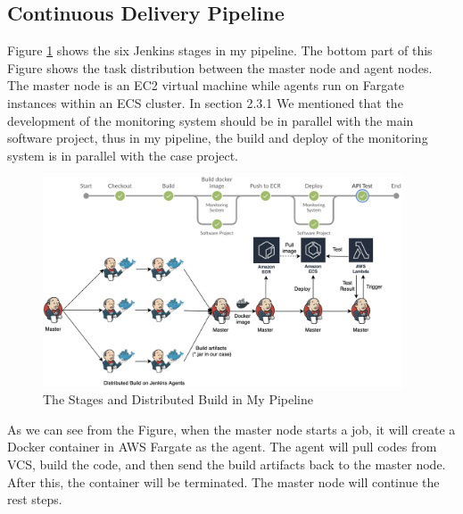 \subsection{Continuous Delivery Pipeline}
\label{my-ci}
Figure \ref{fig:overview} shows the six Jenkins stages in my pipeline. The bottom part of this Figure shows the task distribution between the master node and agent nodes. The master node is an EC2 virtual machine while agents run on Fargate instances within an ECS cluster. In section 2.3.1 We mentioned that the development of the monitoring system should be in parallel with the main software project, thus in my pipeline, the build and deploy of the monitoring system is in parallel with the case project.
\begin{figure}[!h]
     \centering
     \includegraphics[width=0.95\textwidth]{pics/overview.png}
     \caption{The Stages and Distributed Build in My Pipeline}
     \label{fig:overview}
    \end{figure}
\par
As we can see from the Figure, when the master node starts a job, it will create a Docker container in AWS Fargate as the agent. The agent will pull codes from VCS, build the code, and then send the build artifacts back to the master node. After this, the container will be terminated. The master node will continue the rest steps.
